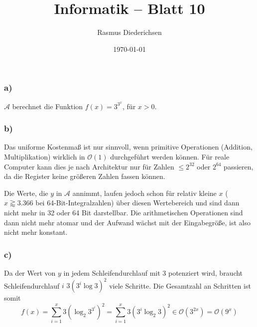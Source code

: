 \documentclass{article}
\title{Informatik \rotatebox[origin=c]{180}{D}\raisebox{2pt}{:} -- Blatt 10}
\author{Rasmus Diederichsen}
\date{\today}
\begin{document}
\maketitle

\section{} 
\subsection{} 
\subsubsection{a)}

$\mathcal{A}$ berechnet die Funktion $f(x) = 3^{3^x}$, für $x > 0$.

\subsubsection{b)}

Das uniforme Kostenmaß ist nur sinnvoll, wenn primitive Operationen
(Addition, Multiplikation) wirklich in $\mathcal{O}(1)$ durchgeführt werden
können. Für reale Computer kann dies je nach Architektur nur für Zahlen $\le
2^{32}$ oder $2^{64}$ passieren, da die Register keine größeren Zahlen fassen
können.

Die Werte, die $y$ in $\mathcal{A}$ annimmt, laufen jedoch schon für relativ
kleine $x$ ($x \gtrapprox 3.366$ bei 64-Bit-Integralzahlen) über diesen Wertebereich und
sind dann nicht mehr in 32 oder 64 Bit darstellbar. Die arithmetischen
Operationen sind dann nicht mehr atomar und der Aufwand wächst mit der
Eingabegröße, ist also nicht mehr konstant.

\subsubsection{c)}

Da der Wert von $y$ in jedem Schleifendurchlauf mit 3 potenziert wird, braucht
Schleifendurchlauf $i$ $3(3^i\log{3})^2$ viele Schritte. Die Gesamtzahl an
Schritten ist somit
\begin{equation*}
   f(x) = \sum\limits_{i=1}^x 3(\log_2 3^{3^i})^2 = \sum\limits_{i=1}^x 3(3^i\log_2 3)^2\in
   \mathcal{O}\left(3^{2x}\right) = \mathcal{O}\left(9^x\right)
\end{equation*}

\subsection{} 
\end{document}
